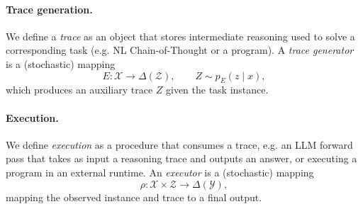 \paragraph{Trace generation.} We define a \emph{trace} as an object that stores intermediate reasoning used to solve a corresponding task (e.g. NL Chain-of-Thought or a program). A \emph{trace generator} is a (stochastic) mapping
\[
E : \mathcal{X} \to \Delta(\mathcal{Z}), \qquad
Z \sim p_E(z \mid x),
\]
which produces an auxiliary trace $Z$ given the task instance.

 
\paragraph{Execution.} We define \emph{execution} as a procedure that consumes a trace, e.g. an LLM forward pass that takes as input a reasoning trace and outputs an answer, or executing a program in an external runtime. An \emph{executor} is a (stochastic) mapping
\[
\rho : \mathcal{X} \times \mathcal{Z} \to \Delta(\mathcal{Y}),
\]
mapping the observed instance and trace to a final output.






